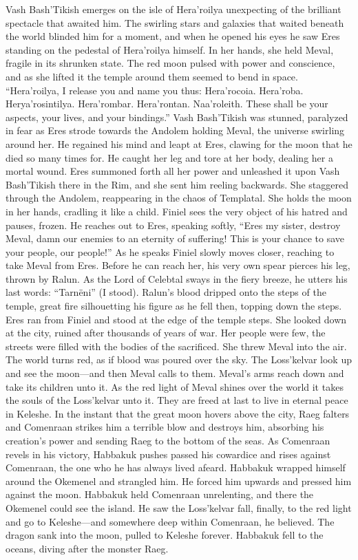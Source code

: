 \documentclass[smalldemyvopaper,11pt,twoside,onecolumn,openright,extrafontsizes]{memoir}
\begin{document}
{{	Vash Bash’Tikish emerges on the isle of Hera’roilya unexpecting of the brilliant spectacle that awaited him. The swirling stars and galaxies that waited beneath the world blinded him for a moment, and when he opened his eyes he saw Eres standing on the pedestal of Hera’roilya himself. In her hands, she held Meval, fragile in its shrunken state. The red moon pulsed with power and conscience, and as she lifted it the temple around them seemed to bend in space. “Hera’roilya, I release you and name you thus: Hera’rocoia. Hera’roba. Herya’rosintilya. Hera’rombar. Hera’rontan. Naa’roleith. These shall be your aspects, your lives, and your bindings.” Vash Bash’Tikish was stunned, paralyzed in fear as Eres strode towards the Andolem holding Meval, the universe swirling around her. He regained his mind and leapt at Eres, clawing for the moon that he died so many times for. He caught her leg and tore at her body, dealing her a mortal wound. Eres summoned forth all her power and unleashed it upon Vash Bash’Tikish there in the Rim, and she sent him reeling backwards. She staggered through the Andolem, reappearing in the chaos of Templatal. She holds the moon in her hands, cradling it like a child. Finiel sees the very object of his hatred and pauses, frozen. He reaches out to Eres, speaking softly, “Eres my sister, destroy Meval, damn our enemies to an eternity of suffering! This is your chance to save your people, our people!” As he speaks Finiel slowly moves closer, reaching to take Meval from Eres. Before he can reach her, his very own spear pierces his leg, thrown by Ralun. As the Lord of Celebtal sways in the fiery breeze, he utters his last words: “Tarnëni” (I stood). Ralun’s blood dripped onto the steps of the temple, great fire silhouetting his figure as he fell then, topping down the steps. Eres ran from Finiel and stood at the edge of the temple steps. She looked down at the city, ruined after thousands of years of war. Her people were few, the streets were filled with the bodies of the sacrificed. She threw Meval into the air. 
The world turns red, as if blood was poured over the sky. The Loss’kelvar look up and see the moon—and then Meval calls to them. Meval’s arms reach down and take its children unto it. As the red light of Meval shines over the world it takes the souls of the Loss’kelvar unto it. They are freed at last to live in eternal peace in Keleshe. In the instant that the great moon hovers above the city, Raeg falters and Comenraan strikes him a terrible blow and destroys him, absorbing his creation’s power and sending Raeg to the bottom of the seas. As Comenraan revels in his victory, Habbakuk pushes passed his cowardice and rises against Comenraan, the one who he has always lived afeard. Habbakuk wrapped himself around the Okemenel and strangled him. He forced him upwards and pressed him against the moon. Habbakuk held Comenraan unrelenting, and there the Okemenel could see the island. He saw the Loss’kelvar fall, finally, to the red light and go to Keleshe—and somewhere deep within Comenraan, he believed. The dragon sank into the moon, pulled to Keleshe forever. Habbakuk fell to the oceans, diving after the monster Raeg.
}}
\end{document}
